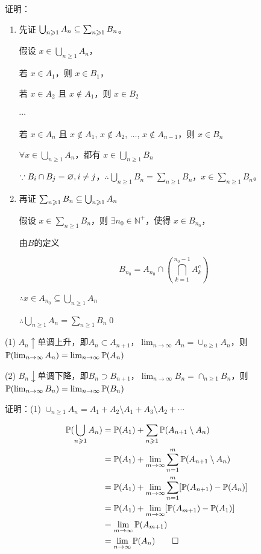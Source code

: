 证明：
\begin{enumerate}
    \item 先证 \(\bigcup_{n \geqslant 1} A_n \subseteq \sum_{n \geqslant 1} B_n\)。

    假设 \(x \in \bigcup_{n \geqslant 1} A_n\)，

    若 \(x \in A_1\)，则 \(x \in B_1\)，

    若 \(x \in A_2\) 且 \(x \notin A_1\)，则 \(x \in B_2\)

    $\cdots$

    若 \(x \in A_n\) 且 \(x \notin A_1\), \(x \notin A_2\), \(\ldots\), \(x \notin A_{n-1}\)，则 \(x \in B_n\)

    $\forall x\in \bigcup_{n\geq 1}A_n$，都有 $x\in \bigcup_{n\geq 1}B_n$

    \(\because B_i \cap B_j = \varnothing,i\neq j\)，\(\therefore \bigcup_{n \geqslant 1} B_n = \sum_{n \geqslant 1} B_n\)，\(x \in \sum_{n \geqslant 1} B_n\)。

    \item 再证 \(\sum_{n \geqslant 1} B_n \subseteq \bigcup_{n \geqslant 1} A_n\)

    假设 \(x \in \sum_{n \geqslant 1} B_n\)，则 \(\exists n_0 \in \mathbb{N}^+\)，使得 \(x \in B_{n_0}\)，

    由$B$的定义

    \[
    B_{n_0} = A_{n_0} \cap \left( \bigcap_{k=1}^{n_0-1} A_k^c \right)
    \]

    \(\therefore x \in A_{n_0} \subseteq \bigcup_{n \geqslant 1} A_n\)

    \(\therefore \bigcup_{n \geqslant 1} A_n = \sum_{n \geqslant 1} B_n\)\qed
\end{enumerate}

\begin{property}[连续性]\label{prt:measure_continuity}
    (1) $A_n\uparrow$单调上升，即$A_n\subset A_{n+1}$，$\lim_{n\rightarrow \infty}A_n=\cup_{n\geq 1}A_n$，则 $\mathbb{P}(\lim_{n\rightarrow \infty}A_n)=\lim_{n\rightarrow \infty}\mathbb{P}(A_n)$

    (2) $B_n\downarrow$单调下降，即$B_n\supset B_{n+1}$，$\lim_{n\rightarrow \infty}B_n=\cap_{n\geq 1}B_n$，则 $\mathbb{P}(\lim_{n\rightarrow \infty}B_n)=\lim_{n\rightarrow \infty}\mathbb{P}(B_n)$
\end{property}

证明：(1) $\cup_{n\geq 1}A_n=A_1+A_2\setminus A_1+A_3\setminus A_2+\cdots$

\[
\begin{aligned}
    \mathbb{P}(\bigcup_{n\geqslant 1}A_n)&=\mathbb{P}(A_1)+\sum_{n\geqslant 1}\mathbb{P}(A_{n+1}\setminus A_n)\\
    &=\mathbb{P}(A_1)+\lim_{m \to \infty}\sum_{n=1}^m \mathbb{P}(A_{n+1}\setminus A_n)\\
    &=\mathbb{P}(A_1)+\lim_{m \to \infty}\sum_{n=1}^m [\mathbb{P}(A_{n+1})-\mathbb{P}(A_n)]\\
    &=\mathbb{P}(A_1)+\lim_{m \to \infty}[\mathbb{P}(A_{m+1})-\mathbb{P}(A_1)]\\
    &=\lim_{m \to \infty} \mathbb{P}(A_{m+1})\\
    &=\lim_{n \to \infty} \mathbb{P}(A_n)\qed
\end{aligned}
\]

